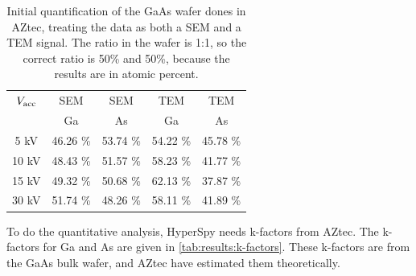 \begin{table}[h]
    \centering
    \caption{
        Initial quantification of the GaAs wafer dones in AZtec, treating the data as both a SEM and a TEM signal.
        The ratio in the wafer is 1:1, so the correct ratio is 50\% and 50\%, because the results are in atomic percent.
    }
    \label{tab:initial_quantification}
    \begin{tabular}{ccccc}
        $V_\textnormal{acc}$ & SEM      & SEM      & TEM      & TEM      \\
                             & Ga       & As       & Ga       & As       \\
        \hline
        5 kV                 & 46.26 \% & 53.74 \% & 54.22 \% & 45.78 \% \\
        10 kV                & 48.43 \% & 51.57 \% & 58.23 \% & 41.77 \% \\
        15 kV                & 49.32 \% & 50.68 \% & 62.13 \% & 37.87 \% \\
        30 kV                & 51.74 \% & 48.26 \% & 58.11 \% & 41.89 \%
    \end{tabular}
\end{table}

To do the quantitative analysis, HyperSpy needs k-factors from AZtec.
The k-factors for Ga and As are given in \cref{tab:results:k-factors}.
These k-factors are from the GaAs bulk wafer, and AZtec have estimated them theoretically.

